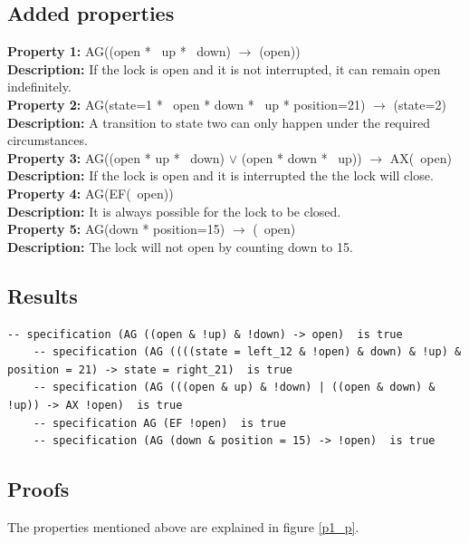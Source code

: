 \documentclass[11pt]{article}
\begin{document}
	\subsection{Added properties}
	\textbf{Property 1:} AG((open * ~up * ~down) $\to$ (open)) 	\\	
	\textbf{Description:} If the lock is open and it is not interrupted, it can remain open indefinitely. \\
	\vspace{12pt}
	\textbf{Property 2:} AG(state=1 * ~open * down  * ~up * position=21) $\to$ (state=2)\\ 
	\textbf{Description:} A transition to state two can only happen under the required circumstances. \\
	\vspace{12pt}
	\textbf{Property 3:} AG((open * up * ~down) $\vee$  (open * down * ~up)) $\to$ AX(~open)\\ \textbf{Description:} If the lock is open and it is interrupted the the lock will close. \\
	\vspace{12pt}
	\textbf{Property 4:} AG(EF(~open)) \\
	\textbf{Description:} It is always possible for the lock to be closed.\\
	\vspace{12pt}
	\textbf{Property 5:} AG(down * position=15) $\to$ (~open) \\
	\textbf{Description:} The lock will not open by counting down to 15.\\

	
	\subsection{Results}
 \begin{lstlisting}[caption=NuSMV Output, label=p1_out]		
	-- specification (AG ((open & !up) & !down) -> open)  is true
	-- specification (AG ((((state = left_12 & !open) & down) & !up) & position = 21) -> state = right_21)  is true
	-- specification (AG (((open & up) & !down) | ((open & down) & !up)) -> AX !open)  is true
	-- specification AG (EF !open)  is true
	-- specification (AG (down & position = 15) -> !open)  is true

  \end{lstlisting}
	


\subsection{Proofs}
The properties mentioned above are explained in figure \ref{p1_p}.
\end{document}
